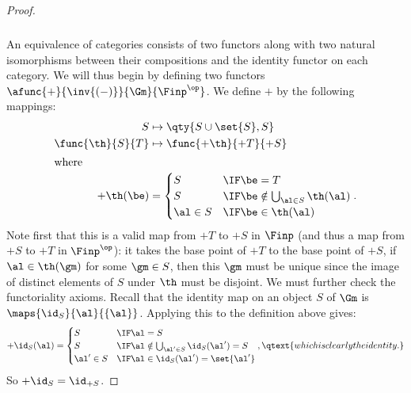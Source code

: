 \documentclass[../../main]{subfiles}
\begin{document}
\begin{proof}
	\subparagraph{}
	An equivalence of categories consists of two functors along with two natural
	isomorphisms between their compositions and the identity functor on each
	category. We will thus begin by defining two functors
	\(\afunc{+}{\inv{(-)}}{\Gm}{\Finp^\op}\). We define \(+\) by the following
	mappings:
	\begin{align*}
		S&\mapsto\qty{S\cup\set{S},S} \\
		\func{\th}{S}{T}&\mapsto\func{+\th}{+T}{+S} \\
		\intertext{where}
		+\th(\be)&=\begin{cases}
			S        & \IF\be=T \\
			S        & \IF\be\notin\bigcup_{\al\in S}\th(\al) \\
			\al\in S & \IF\be\in\th(\al) \\
		\end{cases}.
	\end{align*}
	Note first that this is a valid map from \(+T\) to \(+S\) in \(\Finp\) (and
	thus a map from \(+S\) to \(+T\) in \(\Finp^\op\)): it takes the base point
	of \(+T\) to the base point of \(+S\), if \(\al\in\th(\gm)\) for some
	\(\gm\in S\), then this \(\gm\) must be unique since the image of distinct
	elements of \(S\) under \(\th\) must be disjoint. We must further check the
	functoriality axioms. Recall that the identity map on an object \(S\) of
	\(\Gm\) is \(\maps{\id_S}{\al}{\{\al\}}\). Applying this to the definition
	above gives:
	\[+\id_S(\al)=
		\begin{cases}
			S         & \IF\al=S \\
			S         & \IF\al\notin\bigcup_{\al'\in S}\id_S(\al')=S\\
			\al'\in S & \IF\al\in\id_S(\al')=\set{\al'} \\
		\end{cases},
	\qtext{which is clearly the identity.}\] So \(+\id_S=\id_{+S}\).


\end{proof}
\end{document}

